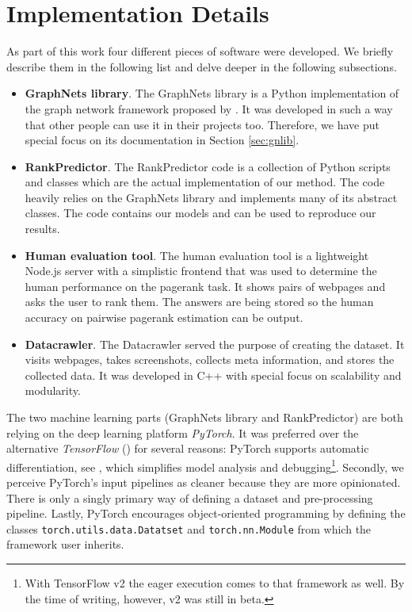 \section{Implementation Details}

As part of this work four different pieces of software were developed. We briefly describe them in the following list and delve deeper in the following subsections.

\begin{itemize}
    \item \textbf{GraphNets library}. The GraphNets library is a Python implementation of the graph network framework proposed by \cite{deepmind:graphnets}. It was developed in such a way that other people can use it in their projects too. Therefore, we have put special focus on its documentation in Section \ref{sec:gnlib}.
    \item \textbf{RankPredictor}. The RankPredictor code is a collection of Python scripts and classes which are the actual implementation of our method. The code heavily relies on the GraphNets library and implements many of its abstract classes. The code contains our models and can be used to reproduce our results.
    \item \textbf{Human evaluation tool}. The human evaluation tool is a lightweight Node.js server with a simplistic frontend that was used to determine the human performance on the pagerank task. It shows pairs of webpages and asks the user to rank them. The answers are being stored so the human accuracy on pairwise pagerank estimation can be output.
    \item \textbf{Datacrawler}. The Datacrawler served the purpose of creating the dataset. It visits webpages, takes screenshots, collects meta information, and stores the collected data. It was developed in C++ with special focus on scalability and modularity.
\end{itemize}

The two machine learning parts (GraphNets library and RankPredictor) are both relying on the deep learning platform \textit{PyTorch}. It was preferred over the alternative \textit{TensorFlow} (\cite{abadi2016:tensorflow}) for several reasons: PyTorch supports automatic differentiation, see \cite{paszke2017automatic:pytorch}, which simplifies model analysis and debugging\footnote{With TensorFlow v2 the eager execution comes to that framework as well. By the time of writing, however, v2 was still in beta.}. Secondly, we perceive PyTorch's input pipelines as cleaner because they are more opinionated. There is only a singly primary way of defining a dataset and pre-processing pipeline. Lastly, PyTorch encourages object-oriented programming by defining the classes \texttt{torch.utils.data.Datatset} and \texttt{torch.nn.Module} from which the framework user inherits.





